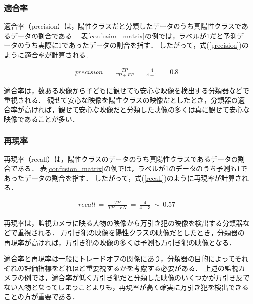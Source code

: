 \documentclass[12pt,a4j]{jreport}
\begin{document}


\subsubsection{適合率}
\label{subsubsection_precision}
適合率（precision）は，陽性クラスだと分類したデータのうち真陽性クラスであるデータの割合である\cite{aurellen20}．
表\ref{confusion_matrix}の例では，ラベルが1だと予測データのうち実際に1であったデータの割合を指す．
したがって，式(\ref{precision})のように適合率が計算される．

\begin{align}
  precision ~=~ \frac{TP}{TP+FP} ~=~ \frac{4}{4+1} ~=~ 0.8
  \label{precision}
\end{align}

適合率は，数ある映像から子どもに観せても安心な映像を検出する分類器などで重視される．
観せて安心な映像を陽性クラスの映像だとしたとき，分類器の適合率が高ければ，観せて安心な映像だと分類した映像の多くは真に観せて安心な映像であることが多い．


\subsubsection{再現率}
\label{subsubsection_recall}
再現率（recall）は，陽性クラスのデータのうち真陽性クラスであるデータの割合である\cite{aurellen20}．
表\ref{confusion_matrix}の例では，ラベルが1のデータのうち予測も1であったデータの割合を指す．
したがって，式(\ref{recall})のように再現率が計算される．

\begin{align}
  recall ~=~ \frac{TP}{TP+FN} ~=~ \frac{4}{4+3} ~\sim~ 0.57
  \label{recall}
\end{align}

再現率は，監視カメラに映る人物の映像から万引き犯の映像を検出する分類器などで重視される．
万引き犯の映像を陽性クラスの映像だとしたとき，分類器の再現率が高ければ，万引き犯の映像の多くは予測も万引き犯の映像となる．

適合率と再現率は一般にトレードオフの関係にあり，分類器の目的によってそれぞれの評価指標をどれほど重要視するかを考慮する必要がある．
上述の監視カメラの例では，適合率が低く万引き犯だと分類した映像のいくつかが万引き反でない人物となってしまうことよりも，再現率が高く確実に万引き犯を検出できることの方が重要である．
\end{document}
